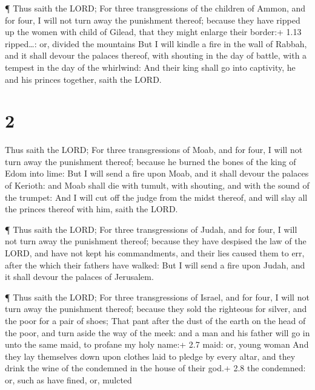  ¶ Thus saith the LORD; For three transgressions of the
children of Ammon, and for four, I will not turn away the punishment
thereof; because they have ripped up the women with child of Gilead,
that they might enlarge their border:+ 1.13 ripped\ldots: or, divided
the mountains  But I will kindle a fire in the wall of
Rabbah, and it shall devour the palaces thereof, with shouting in the
day of battle, with a tempest in the day of the whirlwind: 
And their king shall go into captivity, he and his princes together,
saith the LORD.

\hypertarget{section-1}{%
\section{2}\label{section-1}}

 Thus saith the LORD; For three transgressions of Moab, and
for four, I will not turn away the punishment thereof; because he burned
the bones of the king of Edom into lime:  But I will send a
fire upon Moab, and it shall devour the palaces of Kerioth: and Moab
shall die with tumult, with shouting, and with the sound of the trumpet:
 And I will cut off the judge from the midst thereof, and
will slay all the princes thereof with him, saith the LORD.

 ¶ Thus saith the LORD; For three transgressions of Judah,
and for four, I will not turn away the punishment thereof; because they
have despised the law of the LORD, and have not kept his commandments,
and their lies caused them to err, after the which their fathers have
walked:  But I will send a fire upon Judah, and it shall
devour the palaces of Jerusalem.

 ¶ Thus saith the LORD; For three transgressions of Israel,
and for four, I will not turn away the punishment thereof; because they
sold the righteous for silver, and the poor for a pair of shoes;
 That pant after the dust of the earth on the head of the
poor, and turn aside the way of the meek: and a man and his father will
go in unto the same maid, to profane my holy name:+ 2.7 maid: or, young
woman  And they lay themselves down upon clothes laid to
pledge by every altar, and they drink the wine of the condemned in the
house of their god.+ 2.8 the condemned: or, such as have fined, or,
mulcted

